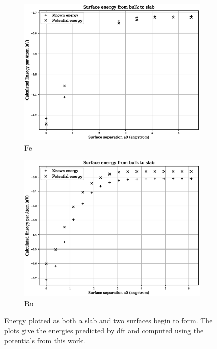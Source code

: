 \begin{figure}[htb]
\begin{subfigure}{.48\textwidth}
  \includegraphics[width=.94\linewidth]{chapters/potentials_fe_pd_ru/feru_potential/fe_surface_energy.eps} 
  \caption{Fe}
  \label{fig:feru-fe-surface}
\end{subfigure}
\begin{subfigure}{.48\textwidth}
  \centering
  \includegraphics[width=.94\linewidth]{chapters/potentials_fe_pd_ru/feru_potential/ru_surface_energy.eps} 
  \caption{Ru}
  \label{fig:feru-ru-surface}
\end{subfigure}
\caption{Energy plotted as both a slab and two surfaces begin to form.  The plots give the energies predicted by \acrshort{dft} and computed using the potentials from this work.}
\label{fig:fepd-feru-surface}
\end{figure}



